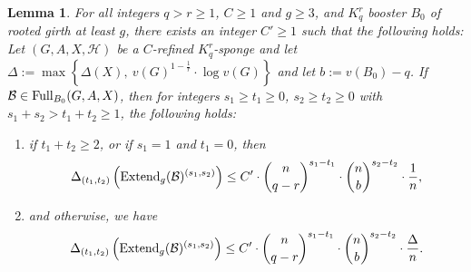 \documentclass[11pt]{article}
\newcommand{\mc}[1]{\mathcal{#1}}
\newcounter{i}
\theoremstyle{plain}
\newtheorem{lem}[thm]{Lemma}
\theoremstyle{plain} %
\theoremstyle{definition}
\begin{document}
\begin{lem}\label{lem:ExtendConfigBoosterDegrees}
For all integers $q>r\ge 1$, $C\ge 1$ and $g\ge 3$, and $K_q^r$ booster $B_0$ of rooted girth at least $g$, there exists an integer $C'\ge 1$ such that the following holds: Let $(G,A,X,\mc{H})$ be a $C$-refined $K_q^r$-sponge and let $\Delta := \max\left\{ \Delta(X),~v(G)^{1-\frac{1}{r}}\cdot \log v(G)\right\}$ and let $b:= v(B_0)-q$. If $\mc{B} \in {\rm Full}_{B_0}(G,A,X)$, then for integers $s_1 \ge t_1 \ge 0$, $s_2\ge t_2\ge 0$ with $s_1+s_2 > t_1+t_2 \ge 1$, the following holds:
\begin{enumerate}
    \item[(1)] if $t_1+t_2 \ge 2$, or if $s_1=1$ and $t_1=0$, then $$\Delta_{(t_1,t_2)}\left({\rm Extend}_g(\mc{B})^{(s_1,s_2)}\right)\le C'\cdot \binom{n}{q-r}^{s_1-t_1}\cdot \binom{n}{b}^{s_2-t_2}\cdot \frac{1}{n},$$
    \item[(2)] and otherwise, we have %
    $$\Delta_{(t_1,t_2)}\left({\rm Extend}_g(\mc{B})^{(s_1,s_2)}\right)\le C'\cdot \binom{n}{q-r}^{s_1-t_1}\cdot \binom{n}{b}^{s_2-t_2}\cdot \frac{\Delta}{n}.$$    
\end{enumerate}    
\end{lem}
\end{document}
